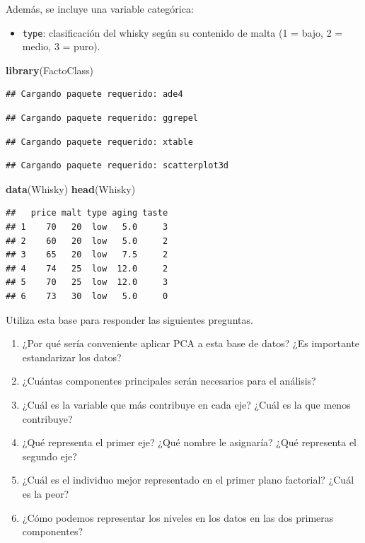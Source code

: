 \documentclass[
]{book}
\newenvironment{Shaded}{\begin{snugshade}}{\end{snugshade}}
\newcommand{\FunctionTok}[1]{\textcolor[rgb]{0.13,0.29,0.53}{\textbf{#1}}}
\newcommand{\NormalTok}[1]{#1}
\providecommand{\tightlist}{%
  \setlength{\itemsep}{0pt}\setlength{\parskip}{0pt}}
\begin{document}
Además, se incluye una variable categórica:

\begin{itemize}
\tightlist
\item
  \texttt{type}: clasificación del whisky según su contenido de malta (1 = bajo, 2 = medio, 3 = puro).
\end{itemize}

\begin{Shaded}
\begin{Highlighting}[]
\FunctionTok{library}\NormalTok{(FactoClass)}
\end{Highlighting}
\end{Shaded}

\begin{verbatim}
## Cargando paquete requerido: ade4
\end{verbatim}

\begin{verbatim}
## Cargando paquete requerido: ggrepel
\end{verbatim}

\begin{verbatim}
## Cargando paquete requerido: xtable
\end{verbatim}

\begin{verbatim}
## Cargando paquete requerido: scatterplot3d
\end{verbatim}

\begin{Shaded}
\begin{Highlighting}[]
\FunctionTok{data}\NormalTok{(Whisky)}
\FunctionTok{head}\NormalTok{(Whisky)}
\end{Highlighting}
\end{Shaded}

\begin{verbatim}
##   price malt type aging taste
## 1    70   20  low   5.0     3
## 2    60   20  low   5.0     2
## 3    65   20  low   7.5     2
## 4    74   25  low  12.0     2
## 5    70   25  low  12.0     3
## 6    73   30  low   5.0     0
\end{verbatim}

Utiliza esta base para responder las siguientes preguntas.

\begin{enumerate}
\def\labelenumi{\alph{enumi})}
\item
  ¿Por qué sería conveniente aplicar PCA a esta base de datos? ¿Es importante estandarizar los datos?
\item
  ¿Cuántas componentes principales serán necesarios para el análisis?
\item
  ¿Cuál es la variable que más contribuye en cada eje? ¿Cuál es la que menos contribuye?
\item
  ¿Qué representa el primer eje? ¿Qué nombre le asignaría? ¿Qué representa el segundo eje?
\item
  ¿Cuál es el individuo mejor representado en el primer plano factorial? ¿Cuál es la peor?
\item
  ¿Cómo podemos representar los niveles en los datos en las dos primeras componentes?
\end{enumerate}
\end{document}

